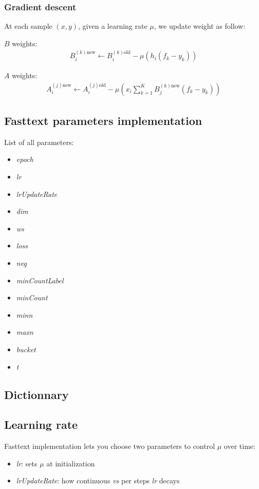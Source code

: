 \subsubsection*{Gradient descent}

At each sample $(x, y)$, given a learning rate $\mu$, we update weight as follow:

$B$ weights:
\begin{align}
	B_i^{(k)\mbox{new}} \leftarrow B_i^{(k)\mbox{old}} - \mu (h_i (f_k - y_k))
\end{align}

$A$ weights:
\begin{align}
	A_i^{(j)\mbox{new}} \leftarrow A_i^{(j)\mbox{old}} - 
	\mu 
	\left(
		x_i \sum_{k=1}^K B_j^{(k)\mbox{new}} (f_k - y_k) 
	\right)
\end{align}

\subsection{Fasttext parameters implementation}

List of all parameters:
\begin{itemize}
	\item \textit{epoch}
	\item \textit{lr}
	\item \textit{lrUpdateRate}
	\item \textit{dim}
	\item \textit{ws}
	\item \textit{loss}
	\item \textit{neg}
	\item \textit{minCountLabel}
	\item \textit{minCount}
	\item \textit{minn}
	\item \textit{maxn}
	\item \textit{bucket}
	\item \textit{t}
\end{itemize}

\subsection*{Dictionnary}

\subsection*{Learning rate}

Fasttext implementation lets you choose two parameters to control $\mu$ over time:
\begin{itemize}
	\item \textit{lr}: sets $\mu$ at initialization
	\item \textit{lrUpdateRate}: how continuous \textit{vs} per steps \textit{lr} decays
\end{itemize}

